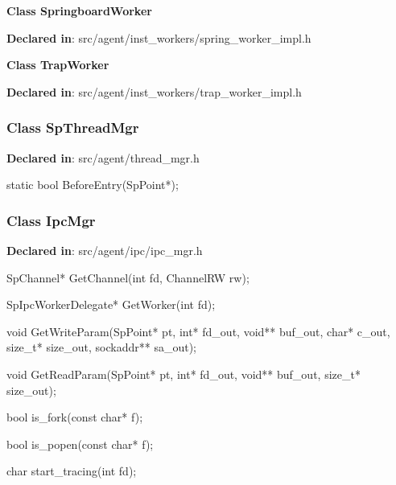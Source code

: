 \textbf{Class SpringboardWorker}

\textbf{Declared in}: src/agent/inst\_workers/spring\_worker\_impl.h

\textbf{Class TrapWorker}

\textbf{Declared in}: src/agent/inst\_workers/trap\_worker\_impl.h


\subsubsection{Class SpThreadMgr}
\textbf{Declared in}: src/agent/thread\_mgr.h

\begin{apient}
static bool BeforeEntry(SpPoint*);
\end{apient}
\apidesc{
}

\subsubsection{Class IpcMgr}
\textbf{Declared in}: src/agent/ipc/ipc\_mgr.h

\begin{apient}
SpChannel* GetChannel(int fd,
                      ChannelRW rw);
\end{apient}
\apidesc{
}

\begin{apient}
SpIpcWorkerDelegate* GetWorker(int fd);
\end{apient}
\apidesc{
}

\begin{apient}
void GetWriteParam(SpPoint* pt,
                   int* fd_out,
                   void** buf_out,
                   char* c_out,
                   size_t* size_out,
                   sockaddr** sa_out);
\end{apient}
\apidesc{
}

\begin{apient}
void GetReadParam(SpPoint* pt,
                  int* fd_out,
                  void** buf_out,
                  size_t* size_out);
\end{apient}
\apidesc{
}

\begin{apient}
bool is_fork(const char* f);
\end{apient}
\apidesc{
}

\begin{apient}
bool is_popen(const char* f);
\end{apient}
\apidesc{
}

\begin{apient}
char start_tracing(int fd);
\end{apient}
\apidesc{
}

